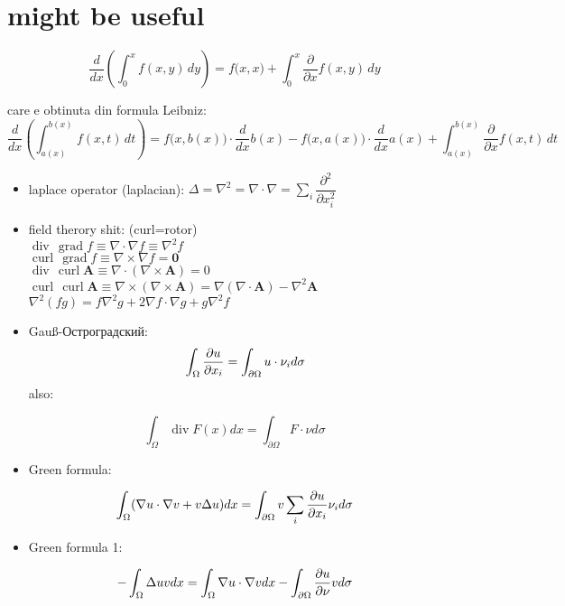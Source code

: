 \documentclass[11pt]{article}
\date{\today}
\title{}
\begin{document}
\section*{might be useful}
\label{sec:org2cda3a3}
\[ \frac{d}{dx} \left (\int_{0}^{x} f(x,y)\,dy \right) = f\big(x,x) + \int_{0}^{x}\frac{\partial}{\partial x} f(x,y) \,dy\]

\medskip

care e obtinuta din formula Leibniz:
\[ \frac{d}{dx} \left (\int_{a(x)}^{b(x)}f(x,t)\,dt \right) = f\big(x,b(x)\big)\cdot \frac{d}{dx} b(x) - f\big(x,a(x)\big)\cdot \frac{d}{dx} a(x) + \int_{a(x)}^{b(x)}\frac{\partial}{\partial x} f(x,t) \,dt\]
\begin{itemize}
\item laplace operator (laplacian): \(\Delta = \nabla^2 = \nabla \cdot \nabla = \displaystyle \sum_i \dfrac{\partial^2}{\partial x_i^2}\)
\item field therory shit: (curl=rotor)\\
\(\operatorname{div}  \, \operatorname{grad} f          \equiv \nabla \cdot  \nabla f \equiv \nabla^2 f\)\\
\(\operatorname{curl} \, \operatorname{grad} f          \equiv \nabla \times \nabla f = \mathbf 0\)\\
\(\operatorname{div}  \, \operatorname{curl} \mathbf{A} \equiv \nabla \cdot  (\nabla \times \mathbf{A}) = 0\)\\
\(\operatorname{curl} \, \operatorname{curl} \mathbf{A} \equiv \nabla \times (\nabla \times \mathbf{A}) = \nabla (\nabla \cdot \mathbf{A}) - \nabla^2 \mathbf{A}\)\\
\(\nabla^2 (f g) = f \nabla^2 g + 2 \nabla f \cdot \nabla g + g \nabla^2 f\)
\item Gauß-Остроградский:
\[ \int_\Omega \frac{\partial u}{\partial x_i} = \int_{\partial \Omega}u \cdot \nu_i d \sigma \]
also:
\end{itemize}
\[ \int_\Omega \operatorname{div} F (x) dx = \int_{\partial \Omega} F  \cdot \nu d \sigma \]
\begin{itemize}
\item Green formula:
\end{itemize}
\[\int_\Omega (\nabla u \cdot \nabla v  + v \Delta u) dx = \int_{\partial \Omega} v \sum_i \frac{\partial u}{\partial x_i} \nu_i d \sigma \]
\begin{itemize}
\item Green formula 1:
\end{itemize}
\[ -\int_\Omega \Delta u v dx = \int_\Omega \nabla u \cdot \nabla v dx - \int_{\partial \Omega} \frac{\partial u}{\partial \nu} v  d \sigma \]
\end{document}
